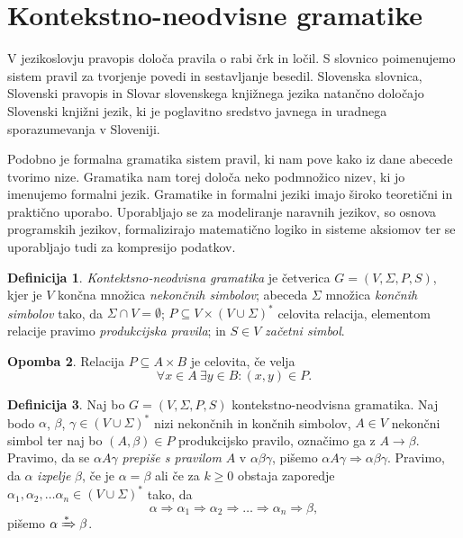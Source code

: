 \documentclass{amsart}
\theoremstyle{definition}
\newtheorem{definicija}{Definicija}[section]
\newtheorem{opomba}[definicija]{Opomba}
\theoremstyle{plain} %
\begin{document}
\section{Kontekstno-neodvisne gramatike}

V jezikoslovju pravopis določa pravila o rabi črk in ločil. S slovnico poimenujemo sistem pravil za tvorjenje
povedi in sestavljanje besedil. Slovenska slovnica, Slovenski pravopis in Slovar slovenskega knjižnega jezika
natančno določajo Slovenski knjižni jezik, ki je poglavitno sredstvo javnega in uradnega sporazumevanja v Sloveniji.


Podobno je formalna gramatika sistem pravil, ki nam pove kako iz dane abecede tvorimo nize. Gramatika nam torej določa
neko podmnožico nizev, ki jo imenujemo formalni jezik. Gramatike in formalni jeziki imajo široko teoretični in praktično
uporabo. Uporabljajo se za modeliranje naravnih jezikov, so osnova programskih jezikov, formalizirajo matematično logiko in
sisteme aksiomov ter se uporabljajo tudi za kompresijo podatkov.

\begin{definicija}

    \textit{Kontektsno-neodvisna gramatika} je četverica $ G = ( V, \Sigma, P, S ) $, kjer je
    $ V $ končna množica \textit{nekončnih simbolov}; abeceda $ \Sigma $ množica \textit{končnih simbolov}
    tako, da $ \Sigma \cap V = \emptyset $; $ P \subseteq V \times ( V \cup \Sigma )^* $ celovita relacija,
    elementom relacije pravimo \textit{produkcijska pravila}; in $ S \in V $ \textit{začetni simbol}.

\end{definicija}

\begin{opomba}
    
    Relacija $ P \subseteq A \times B $ je celovita, če velja
    \[
        \forall x \in A \ \exists y \in B \colon (x,y) \in P.
    \]

\end{opomba}

\begin{definicija}
    
    Naj bo $ G = ( V, \Sigma, P, S ) $ kontekstno-neodvisna gramatika. Naj bodo $ \alpha $,
    $ \beta $, $ \gamma \in ( V \cup \Sigma )^* $ nizi nekončnih in končnih simbolov,
    $ A \in V $ nekončni simbol ter naj bo $ ( A, \beta ) \in P $ produkcijsko pravilo,
    označimo ga z $ A \rightarrow \beta $. Pravimo, da se $ \alpha A \gamma $ 
    \textit{prepiše s pravilom} $ A $ v $ \alpha\beta\gamma $, pišemo $ \alpha A \gamma  \Rightarrow 
    \alpha\beta\gamma $. Pravimo, da $ \alpha $ \textit{izpelje} $ \beta $, če je $ \alpha = \beta $ ali če
    za $ k \geq 0 $ obstaja zaporedje $ \alpha_1, \alpha_2, \ldots \alpha_n
    \in ( V \cup \Sigma )^* $ tako, da 
    \[
        \alpha \Rightarrow \alpha_1 \Rightarrow \alpha_2 \Rightarrow \ldots \Rightarrow \alpha_n
        \Rightarrow \beta,
    \]
    pišemo $ \alpha \xRightarrow{*} \beta $.

\end{definicija}
\end{document}
